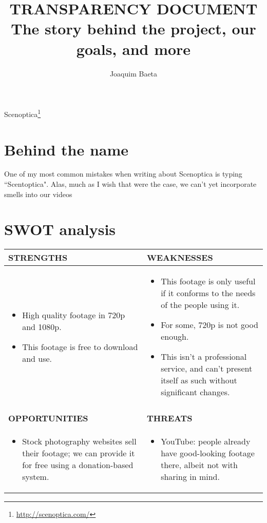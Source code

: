 \documentclass[11pt, a4paper]{article}
\title{\Huge \textbf{TRANSPARENCY DOCUMENT} \\ \Large \textbf{The story behind the project, our goals, and more} }
\author{Joaquim Baeta}
\begin{document}
\maketitle

Scenoptica\footnote{\url{http://scenoptica.com/}}

\section*{Behind the name}

One of my most common mistakes when writing about Scenoptica is typing ``Scentoptica". Alas, much as I wish that were the case, we can't yet incorporate smells into our videos \\

\restoregeometry
{}

\newpage
\section*{SWOT analysis}
\begin{minipage}{\textwidth}
\begin{tabularx}{\textwidth}{>{\raggedright\arraybackslash}p{5.9cm} | >{\raggedright\arraybackslash}p{6.5cm}}
\bf STRENGTHS & \bf WEAKNESSES \\\midrule
\begin{itemize}
\item{High quality footage in 720p and 1080p.}
\item{This footage is free to download and use.}
\end{itemize} & \begin{itemize}
\item{This footage is only useful if it conforms to the needs of the people using it.}
\item{For some, 720p is not good enough.}
\item{This isn't a professional service, and can't present itself as such without significant changes.}
\end{itemize}\\
\\
\bf OPPORTUNITIES & \bf THREATS \\\midrule
\begin{itemize}
\item{Stock photography websites sell their footage; we can provide it for free using a donation-based system.}
\end{itemize} & \begin{itemize}
\item{YouTube: people already have good-looking footage there, albeit not with sharing in mind.}
\end{itemize}
\end {tabularx}
\end{minipage}
\bigskip
\end{document}
